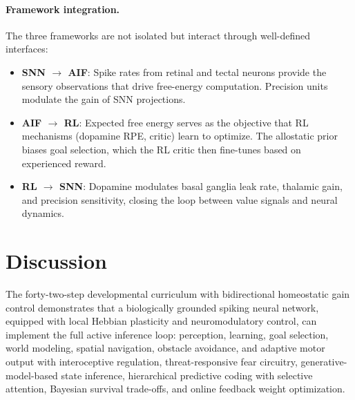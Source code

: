 \documentclass[11pt,a4paper]{article}
\begin{document}
\paragraph{Framework integration.}
The three frameworks are not isolated but interact through
well-defined interfaces:
\begin{itemize}[nosep]
  \item \textbf{SNN $\to$ AIF}: Spike rates from retinal and tectal neurons
    provide the sensory observations that drive free-energy computation.
    Precision units modulate the gain of SNN projections.
  \item \textbf{AIF $\to$ RL}: Expected free energy serves as the objective
    that RL mechanisms (dopamine RPE, critic) learn to optimize.
    The allostatic prior biases goal selection, which the RL critic then
    fine-tunes based on experienced reward.
  \item \textbf{RL $\to$ SNN}: Dopamine modulates basal ganglia leak rate,
    thalamic gain, and precision sensitivity, closing the loop between
    value signals and neural dynamics.
\end{itemize}

\section{Discussion}\label{sec:discussion}

The forty-two-step developmental curriculum with bidirectional homeostatic
gain control demonstrates that a biologically grounded spiking neural network, equipped with local Hebbian plasticity and
neuromodulatory control, can implement the full active inference loop:
perception, learning, goal selection, world modeling, spatial navigation,
obstacle avoidance, and adaptive motor output with interoceptive regulation,
threat-responsive fear circuitry, generative-model-based state inference,
hierarchical predictive coding with selective attention, Bayesian survival
trade-offs, and online feedback weight optimization.
\end{document}
